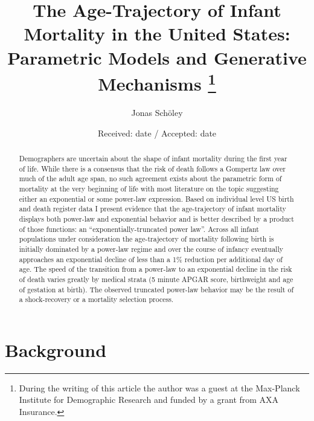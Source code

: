 \documentclass[smallextended]{svjour3} %
\title{The Age-Trajectory of Infant Mortality in the United States: Parametric
Models and Generative Mechanisms \thanks{During the writing of this article the author was a guest at the
Max-Planck Institute for Demographic Research and funded by a grant from
AXA Insurance.} }
\author{  Jonas Schöley  }
\institute{
        Jonas Schöley \at
     Interdisciplinary Centre on Population Dynamics, University of Southern
 Denmark \\
     \email{\href{mailto:jschoeley@health.sdu.dk}{\nolinkurl{jschoeley@health.sdu.dk}}} 
    }
\date{Received: date / Accepted: date}
\begin{document}
\maketitle

\begin{abstract}
Demographers are uncertain about the shape of infant mortality during
the first year of life. While there is a consensus that the risk of
death follows a Gompertz law over much of the adult age span, no such
agreement exists about the parametric form of mortality at the very
beginning of life with most literature on the topic suggesting either an
exponential or some power-law expression. Based on individual level US
birth and death register data I present evidence that the age-trajectory
of infant mortality displays both power-law and exponential behavior and
is better described by a product of those functions: an
``exponentially-truncated power law''. Across all infant populations
under consideration the age-trajectory of mortality following birth is
initially dominated by a power-law regime and over the course of infancy
eventually approaches an exponential decline of less than a 1\%
reduction per additional day of age. The speed of the transition from a
power-law to an exponential decline in the risk of death varies greatly
by medical strata (5 minute APGAR score, birthweight and age of
gestation at birth). The observed truncated power-law behavior may be
the result of a shock-recovery or a mortality selection process.
\\


\end{abstract}

\def\spacingset#1{\renewcommand{\baselinestretch}%
{#1}\small\normalsize} \spacingset{1}

\newpage

\section*{Background}\label{background}
\end{document}
